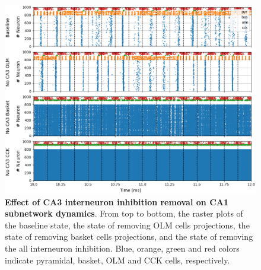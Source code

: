 \documentclass[../main.tex]{subfiles}
\begin{document}
\begin{figure}[t]
    \centering
    \includegraphics[width=\textwidth]{chapter4/figures/removing_interneurons/removing_interneurons_ca1_v1_rasters.png}
    \caption{\textbf{Effect of CA3 interneuron inhibition removal on CA1 subnetwork dynamics}.
    From top to bottom, the raster plots of the baseline state, the state of removing OLM cells projections, the state of removing basket cells projections, and the state of removing the all interneuron inhibition.
    Blue, orange, green and red colors indicate pyramidal, basket, OLM and CCK cells, respectively.}
    \label{fig:interneurons-ca1-1-rasters}
\end{figure}
\end{document}
